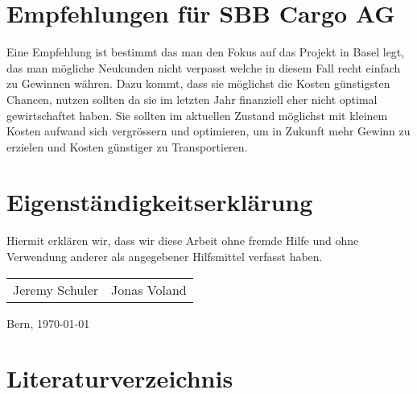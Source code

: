 \documentclass{article}
\begin{document}
\section{Empfehlungen für SBB Cargo AG}

Eine Empfehlung ist bestimmt das man den Fokus auf das Projekt in Basel legt, das man mögliche Neukunden nicht verpasst welche in diesem Fall recht einfach zu Gewinnen währen.
Dazu kommt, dass sie möglichst die Kosten günstigsten Chancen, nutzen sollten da sie im letzten Jahr finanziell eher nicht optimal gewirtschaftet haben.
Sie sollten im aktuellen Zustand möglichst mit kleinem Kosten aufwand sich vergrössern und optimieren, um in Zukunft mehr Gewinn zu erzielen und Kosten günstiger zu Transportieren. 

\section{Eigenständigkeitserklärung}

Hiermit erklären wir, dass wir diese Arbeit ohne fremde Hilfe und ohne Verwendung anderer als angegebener Hilfsmittel verfasst haben.

\begin{center}
\begin{tabular}{ c c }
    Jeremy Schuler & Jonas Voland\\
\end{tabular}
\end{center}
Bern, \today

\newpage

\section{Literaturverzeichnis}
\printbibliography[heading=none]
\end{document}
